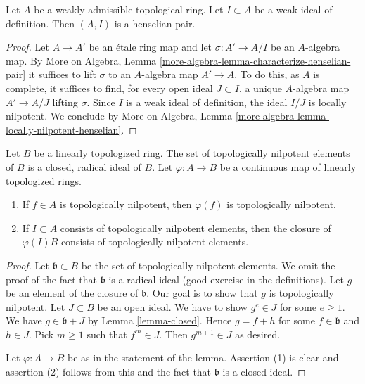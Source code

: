 \begin{lemma}
\label{lemma-weakly-admissible-henselian}
Let $A$ be a weakly admissible topological ring. Let $I \subset A$
be a weak ideal of definition. Then $(A, I)$ is a henselian pair.
\end{lemma}

\begin{proof}
Let $A \to A'$ be an \'etale ring map and let $\sigma : A' \to A/I$
be an $A$-algebra map. By More on Algebra, Lemma
\ref{more-algebra-lemma-characterize-henselian-pair} it suffices
to lift $\sigma$ to an $A$-algebra map $A' \to A$.
To do this, as $A$ is complete, it suffices to find,
for every open ideal $J \subset I$, a unique $A$-algebra map $A' \to A/J$
lifting $\sigma$. Since $I$ is a weak ideal of definition,
the ideal $I/J$ is locally nilpotent. We conclude by
More on Algebra, Lemma \ref{more-algebra-lemma-locally-nilpotent-henselian}.
\end{proof}

\begin{lemma}
\label{lemma-topologically-nilpotent}
Let $B$ be a linearly topologized ring. The set of topologically nilpotent
elements of $B$ is a closed, radical ideal of $B$.
Let $\varphi : A \to B$ be a continuous map of linearly topologized rings.
\begin{enumerate}
\item If $f \in A$ is topologically nilpotent, then $\varphi(f)$ is
topologically nilpotent.
\item If $I \subset A$ consists of topologically nilpotent elements,
then the closure of $\varphi(I)B$ consists of topologically nilpotent
elements.
\end{enumerate}
\end{lemma}

\begin{proof}
Let $\mathfrak b \subset B$ be the set of topologically nilpotent elements.
We omit the proof of the fact that $\mathfrak b$ is a radical ideal
(good exercise in the definitions). Let $g$ be an element of the closure
of $\mathfrak b$. Our goal is to show that $g$ is topologically nilpotent.
Let $J \subset B$ be an open ideal. We have to show
$g^e \in J$ for some $e \geq 1$. We have $g \in \mathfrak b + J$
by Lemma \ref{lemma-closed}. Hence $g = f + h$
for some $f \in \mathfrak b$ and $h \in J$. Pick $m \geq 1$ such that
$f^m \in J$. Then $g^{m + 1} \in J$ as desired.

\medskip\noindent
Let $\varphi : A \to B$ be as in the statement of the lemma.
Assertion (1) is clear and assertion (2) follows from this and
the fact that $\mathfrak b$ is a closed ideal.
\end{proof}

